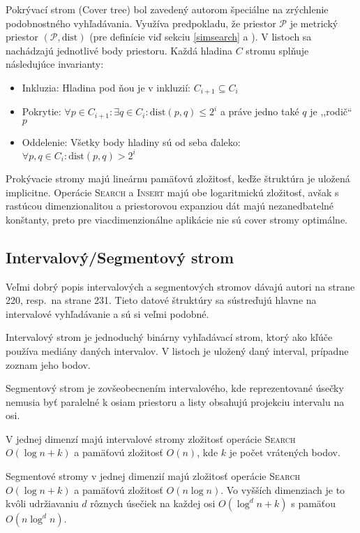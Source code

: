 \documentclass[10pt,a4paper,oneside]{article}
\newcommand{\dist}{\text{dist}} %
\begin{document}
{Pokrývací strom (Cover tree) bol zavedený autorom \citet{Clarkson06} špeciálne na zrýchlenie podobnostného vyhľadávania. Využíva predpokladu, že priestor $\mathcal{P}$ je metrický priestor $(\mathcal{P}, \dist)$ (pre definície viď sekciu \ref{simsearch} a \citet{choudhary92}). V listoch sa nachádzajú jednotlivé body priestoru. Každá hladina $C$ stromu splňuje následujúce invarianty:
\begin{itemize}
\item Inkluzia: Hladina pod ňou je v inkluzií: $C_{i+1} \subseteq C_i$
\item Pokrytie: $\forall p \in C_{i+1} : \exists q \in C_i : \dist(p, q) \leq 2^i$ a práve jedno také $q$ je ,,rodič`` $p$
\item Oddelenie: Všetky body hladiny sú od seba ďaleko: $\forall p,q \in C_i : \dist(p,q) > 2^i$
\end{itemize}

Prokývacie stromy majú lineárnu pamäťovú zložitosť, keďže štruktúra je uložená implicitne. Operácie \textsc{Search} a \textsc{Insert} majú obe logaritmickú zložitosť, avšak s rastúcou dimenzionalitou a priestorovou expanziou dát majú nezanedbatelné konštanty, preto pre viacdimenzionálne aplikácie nie sú cover stromy optimálne.

\subsection{Intervalový/Segmentový strom}\label{intsegtree}

Veľmi dobrý popis intervalových a segmentových stromov dávajú autori \citet{berg08} na strane 220, resp.~na strane 231. Tieto datové štruktúry sa sústreďujú hlavne na intervalové vyhľadávanie a sú si veľmi podobné. 

Intervalový strom je jednoduchý binárny vyhľadávací strom, ktorý ako kľúče používa mediány daných intervalov. V listoch je uložený daný interval, prípadne zoznam jeho bodov.

Segmentový strom je zovšeobecnením intervalového, kde reprezentované úsečky nemusia byť paralelné k osiam priestoru a listy obsahujú projekciu intervalu na osi.

V jednej dimenzí majú intervalové stromy zložitosť operácie \textsc{Search} $O(\log n + k)$ a pamäťovú zložitosť $O(n)$, kde $k$ je počet vrátených bodov.

Segmentové stromy v jednej dimenzií majú zložitosť operácie \textsc{Search} $O(\log n + k)$ a pamäťovú zložitosť $O(n \log n)$. Vo vyšších dimenziach je to kvôli udržiavaniu $d$ rôznych úsečiek na každej osi $O(\log^d n + k)$ s pamäťou $O(n\log^d n)$.

}
\end{document}
